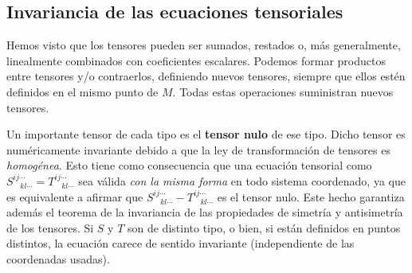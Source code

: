 \subsection{Invariancia de las ecuaciones tensoriales}

Hemos visto que los tensores pueden ser sumados, restados o, más
generalmente, linealmente combinados con coeficientes escalares. Podemos
formar productos entre tensores y/o contraerlos, definiendo nuevos tensores, siempre
que  ellos estén definidos en el mismo punto de $M$. Todas estas operaciones suministran nuevos tensores.

Un importante tensor de cada tipo es el \textbf{tensor
nulo} de ese tipo. Dicho tensor es numéricamente invariante debido a que la ley de transformación de tensores es \textit{homogénea}. Esto tiene
como consecuencia que una ecuación tensorial como
$S_{\ \ \ \ kl\cdots}^{ij\cdots}=T_{\ \ \ \ kl\cdots}^{ij\cdots}$ sea
válida \textit{con la misma forma} en todo sistema coordenado, ya que es equivalente a afirmar que $S_{\
\ \ \ kl\cdots}^{ij\cdots}-T_{\ \ \ \ kl\cdots}^{ij\cdots}$ es el tensor
nulo.
Este hecho garantiza además el teorema de la invariancia de las propiedades de
simetría y antisimetría de los tensores. Si $S$ y $T$ son de distinto tipo, o
bien, si están definidos en puntos distintos, la ecuación carece de sentido
invariante (independiente de las coordenadas usadas).

